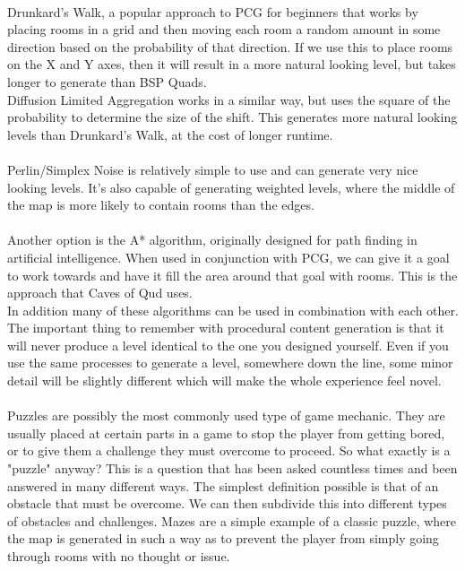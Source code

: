 \documentclass[lettersize,journal]{IEEEtran}
\begin{document}
\\Drunkard's Walk, a popular approach to PCG for beginners that works by placing rooms in a grid and then moving each room a random amount in some direction based on the probability of that direction. If we use this to place rooms on the X and Y axes, then it will result in a more natural looking level, but takes longer to generate than BSP Quads.\cite {6017222}\cite {roberts2014learning}
\\Diffusion Limited Aggregation works in a similar way, but uses the square of the probability to determine the size of the shift. This generates more natural looking levels than Drunkard's Walk, at the cost of longer runtime.\\\cite {shaker2016procedural}
\\Perlin/Simplex Noise is relatively simple to use and can generate very nice looking levels. It's also capable of generating weighted levels, where the middle of the map is more likely to contain rooms than the edges.\\\cite {shaker2016procedural}
\\Another option is the A* algorithm, originally designed for path finding in artificial intelligence. When used in conjunction with PCG, we can give it a goal to work towards and have it fill the area around that goal with rooms. This is the approach that Caves of Qud uses.\\\cite {shaker2016procedural} \cite {roberts2014learning}\cite {short2017procedural}
In addition many of these algorithms can be used in combination with each other.
\\The important thing to remember with procedural content generation is that it will never produce a level identical to the one you designed yourself. Even if you use the same processes to generate a level, somewhere down the line, some minor detail will be slightly different which will make the whole experience feel novel.\\
\\Puzzles are possibly the most commonly used type of game mechanic. They are usually placed at certain parts in a game to stop the player from getting bored, or to give them a challenge they must overcome to proceed.
So what exactly is a "puzzle" anyway? This is a question that has been asked countless times and been answered in many different ways.
The simplest definition possible is that of an obstacle that must be overcome. We can then subdivide this into different types of obstacles and challenges.
Mazes are a simple example of a classic puzzle, where the map is generated in such a way as to prevent the player from simply going through rooms with no thought or issue.
\end{document}
